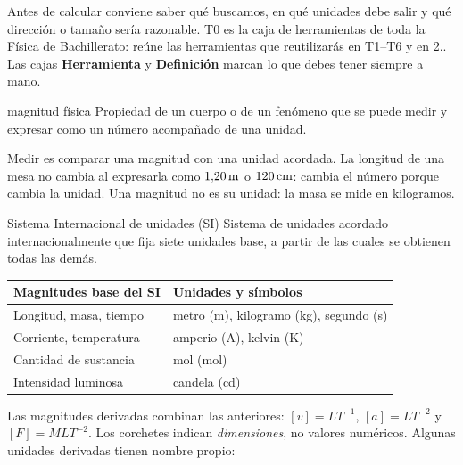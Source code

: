 \documentclass[11pt,a4paper]{article}
\begin{document}
\shorthandoff{<>}
\color{Ink}
Antes de calcular conviene saber qu\'e buscamos, en qu\'e unidades debe salir y qu\'e
direcci\'on o tama\~no ser\'ia razonable.
T0 es la caja de herramientas de toda la F\'isica de Bachillerato: re\'une las
herramientas que reutilizar\'as en T1--T6 y en 2.\textordmasculine.
Las cajas \textbf{\textcolor{ToolLine}{Herramienta}} y
\textbf{\textcolor{DefLine}{Definici\'on}} marcan lo que debes tener siempre a mano.
\begin{lessonindex}
\end{lessonindex}

\begin{defbox}{magnitud f\'isica}
Propiedad de un cuerpo o de un fen\'omeno que se puede medir y expresar como un
n\'umero acompa\~nado de una unidad.
\end{defbox}
Medir es comparar una magnitud con una unidad acordada. La longitud de una mesa no
cambia al expresarla como $1{,}20\,\mathrm{m}$ o $120\,\mathrm{cm}$: cambia el n\'umero porque
cambia la unidad. Una magnitud no es su unidad: la masa se mide en kilogramos.
\begin{defbox}{Sistema Internacional de unidades (SI)}
Sistema de unidades acordado internacionalmente que fija siete unidades base,
a partir de las cuales se obtienen todas las dem\'as.
\end{defbox}
\begin{tabularx}{\linewidth}{@{}>{\raggedright\arraybackslash}p{4.6cm}Y@{}}
\toprule
Magnitudes base del SI & Unidades y s\'imbolos\\
\midrule
Longitud, masa, tiempo & metro (m), kilogramo (kg), segundo (s)\\
Corriente, temperatura & amperio (A), kelvin (K)\\
Cantidad de sustancia & mol (mol)\\
Intensidad luminosa & candela (cd)\\
\bottomrule
\end{tabularx}
Las magnitudes derivadas combinan las anteriores:
$[v]=LT^{-1}$, $[a]=LT^{-2}$ y $[F]=MLT^{-2}$.
Los corchetes indican \emph{dimensiones}, no valores num\'ericos.
Algunas unidades derivadas tienen nombre propio:
\end{document}

